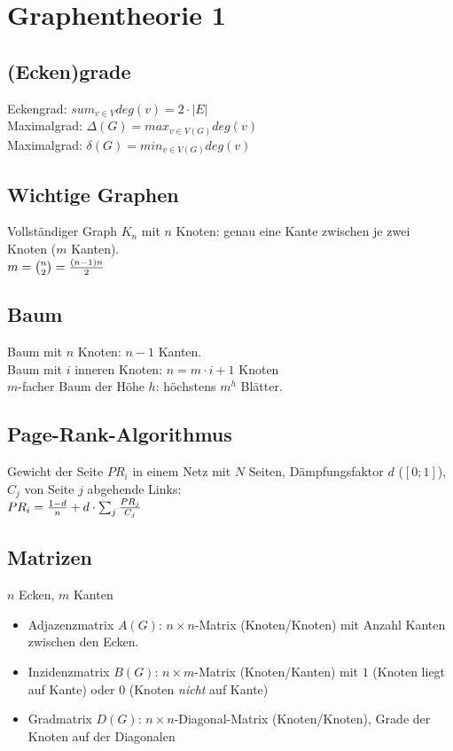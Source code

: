 \section{Graphentheorie 1}

\subsection{(Ecken)grade}

Eckengrad: $ sum_{v \in V} deg(v) = 2 \cdot |E| $
\\
Maximalgrad: $ \Delta(G) = max_{v \in V(G)} {deg}(v) $
\\
Maximalgrad: $ \delta(G) = min_{v \in V(G)} {deg}(v) $

\subsection{Wichtige Graphen}

Vollständiger Graph $K_n$ mit $n$ Knoten: genau eine Kante zwischen je zwei Knoten ($m$ Kanten).
\\
$ m = {{n}\choose{2}} = {{(n-1)n}\over{2}} $ 

\subsection{Baum}

Baum mit $n$ Knoten: $n-1$ Kanten.
\\
Baum mit $i$ inneren Knoten: $n=m \cdot i + 1$ Knoten
\\
$m$-facher Baum der Höhe $h$: höchstens $m^h$ Blätter.

\subsection{Page-Rank-Algorithmus}

Gewicht der Seite $PR_i$ in einem Netz mit $N$ Seiten, Dämpfungsfaktor $d$ ($[0;1]$), $C_j$ von Seite $j$ abgehende Links:
\\
$PR_i = {{1-d}\over{n}} + d \cdot \sum_{j} {{PR_j}\over{C_j}}$

\subsection{Matrizen}

$n$ Ecken, $m$ Kanten

\begin{itemize}
\item{Adjazenzmatrix $A(G)$: $n \times n$-Matrix (Knoten/Knoten) mit Anzahl Kanten zwischen den Ecken.}
\item{Inzidenzmatrix $B(G)$: $n \times m$-Matrix (Knoten/Kanten) mit $1$ (Knoten liegt auf Kante) oder $0$ (Knoten \textit{nicht} auf Kante)}
\item{Gradmatrix $D(G)$: $n \times n$-Diagonal-Matrix (Knoten/Knoten), Grade der Knoten auf der Diagonalen}
\end{itemize}

